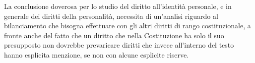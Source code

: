 
La conclusione doverosa per lo studio del diritto all'identità personale, e in generale dei diritti della personalità, necessita di un'analisi riguardo al bilanciamento che bisogna effettuare con gli altri diritti di rango costituzionale, a fronte anche del fatto che un diritto che nella Costituzione ha solo il suo presupposto non dovrebbe prevaricare diritti che invece all'interno del testo hanno esplicita menzione, se non con alcune esplicite riserve.

